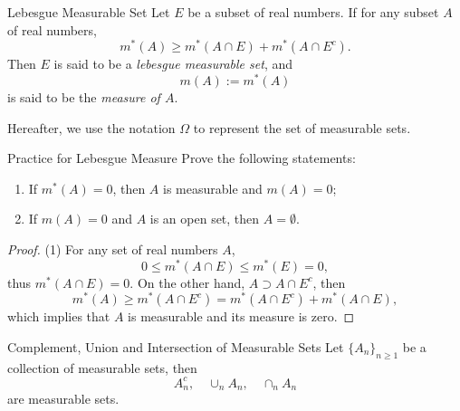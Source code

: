 \begin{definition}{Lebesgue Measurable Set}{}
  Let $E$ be a subset of real numbers.
  If for any subset $A$ of real numbers,
  \begin{equation}
    m^{\ast}(A) \geq m^{\ast}(A \cap E) + m^{\ast}(A \cap E^c).
  \end{equation}
  Then $E$ is said to be a \emph{lebesgue measurable set},
  and
  \begin{equation}
    m(A) := m^{\ast}(A)
  \end{equation}
  is said to be the \emph{measure of $A$}.
\end{definition}

\begin{note}
  Hereafter, we use the notation $\Omega$ to represent the set of measurable sets.
\end{note}

\begin{example}{Practice for Lebesgue Measure}{}
  Prove the following statements:
  \begin{enumerate}
  \item If $m^{\ast}(A) = 0$, then $A$ is measurable and $m(A) = 0$;
  \item If $m(A) = 0$ and $A$ is an open set, then $A = \emptyset$.
  \end{enumerate}
\end{example}

\begin{proof}
  (1) For any set of real numbers $A$,
  \begin{equation}
    0 \leq m^{\ast}(A \cap E) \leq m^{\ast}(E) = 0,
  \end{equation}
  thus $m^{\ast}(A \cap E) = 0$. On the other hand, $A \supset A \cap E^c$,
  then
  \begin{equation}
    m^{\ast}(A) \geq m^{\ast}(A \cap E^c) = m^{\ast}(A \cap E^c) + m^{\ast}(A \cap E),
  \end{equation}
  which implies that $A$ is measurable and its measure is zero.
\end{proof}

\begin{theorem}{Complement, Union and Intersection of Measurable Sets}{}
  Let $\{A_n\}_{n \geq 1}$ be a collection of measurable sets, then
  \begin{equation}
    A_n^c, \quad \cup _n A_n, \quad \cap _n A_n
  \end{equation}
  are measurable sets.
\end{theorem}

